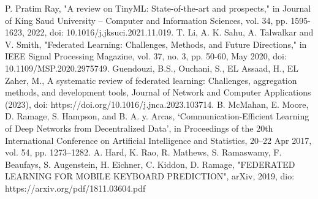 \documentclass[conference]{IEEEtran}
\begin{document}
\begin{thebibliography}{00}
 P. Pratim Ray, "A review on TinyML: State-of-the-art and prospects," in Journal of King Saud University –
Computer and Information Sciences, vol. 34, pp. 1595-1623, 2022, doi: 10.1016/j.jksuci.2021.11.019.
 T. Li, A. K. Sahu, A. Talwalkar and V. Smith, "Federated Learning: Challenges, Methods, and Future Directions," in IEEE Signal Processing Magazine, vol. 37, no. 3, pp. 50-60, May 2020, doi: 10.1109/MSP.2020.2975749.
 Guendouzi, B.S., Ouchani, S., EL Assaad, H., EL Zaher, M., A systematic
review of federated learning: Challenges, aggregation methods, and development tools, Journal of
Network and Computer Applications (2023), doi: https://doi.org/10.1016/j.jnca.2023.103714.
 B. McMahan, E. Moore, D. Ramage, S. Hampson, and B. A. y. Arcas, ‘Communication-Efficient Learning of Deep Networks from Decentralized Data’, in Proceedings of the 20th International Conference on Artificial Intelligence and Statistics, 20--22 Apr 2017, vol. 54, pp. 1273–1282.
 A. Hard, K. Rao, R. Mathews, S. Ramaswamy, F. Beaufays, S. Augenstein, H. Eichner, C. Kiddon, D. Ramage, "FEDERATED LEARNING FOR MOBILE KEYBOARD PREDICTION", arXiv, 2019, dio: https://arxiv.org/pdf/1811.03604.pdf
\end{thebibliography}
\vspace{12pt}
\end{document}
